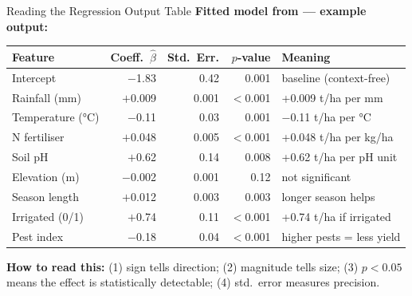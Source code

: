 \documentclass[aspectratio=169,10pt]{beamer}
\begin{document}
\begin{frame}{Reading the Regression Output Table}
  \textbf{Fitted model from \dataset{} --- example output:}
  \vspace{0.2cm}
  \begin{center}
  \small
  \begin{tabular}{lrrrl}
    \toprule
    \textbf{Feature} & \textbf{Coeff.\ $\hat\beta$} & \textbf{Std.\ Err.} & \textbf{$p$-value} & \textbf{Meaning} \\
    \midrule
    Intercept         & $-$1.83 & 0.42 & 0.001 & baseline (context-free) \\
    Rainfall (mm)     & $+$0.009 & 0.001 & $<$0.001 & +0.009 t/ha per mm \\
    Temperature (°C)  & $-$0.11  & 0.03  & 0.001 & $-$0.11 t/ha per °C \\
    N fertiliser      & $+$0.048 & 0.005 & $<$0.001 & +0.048 t/ha per kg/ha \\
    Soil pH           & $+$0.62  & 0.14  & 0.008 & +0.62 t/ha per pH unit \\
    Elevation (m)     & $-$0.002 & 0.001 & 0.12 & \textcolor{SlateG}{not significant} \\
    Season length     & $+$0.012 & 0.003 & 0.003 & longer season helps \\
    Irrigated (0/1)   & $+$0.74  & 0.11  & $<$0.001 & +0.74 t/ha if irrigated \\
    Pest index        & $-$0.18  & 0.04  & $<$0.001 & higher pests = less yield \\
    \bottomrule
  \end{tabular}
  \end{center}
  \begin{tcolorbox}[mybox]
    \small \textbf{How to read this:} (1) sign tells direction; (2) magnitude tells size; (3) $p<0.05$ means the effect is statistically detectable; (4) std.\ error measures precision.
  \end{tcolorbox}
\end{frame}
\end{document}
